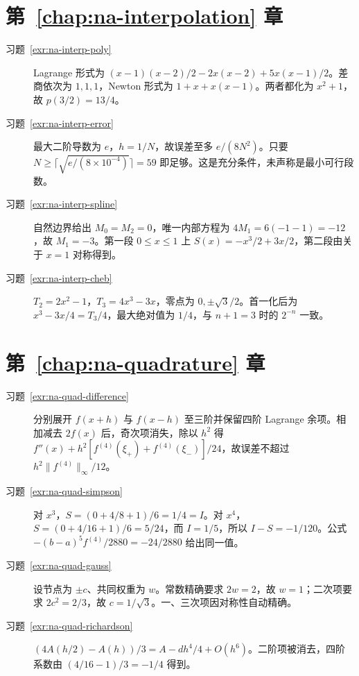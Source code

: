 \documentclass[UTF8,12pt,a4paper,fontset=fandol]{ctexbook}
\begin{document}
\section{第~\ref{chap:na-interpolation} 章}
\begin{description}
\item[习题~\ref{exr:na-interp-poly}] Lagrange 形式为 $(x-1)(x-2)/2-2x(x-2)+5x(x-1)/2$。差商依次为 $1,1,1$，Newton 形式为 $1+x+x(x-1)$。两者都化为 $x^2+1$，故 $p(3/2)=13/4$。
\item[习题~\ref{exr:na-interp-error}] 最大二阶导数为 $e$，$h=1/N$，故误差至多 $e/(8N^2)$。只要 $N\ge\lceil\sqrt{e/(8\times10^{-4})}\rceil=59$ 即足够。这是充分条件，未声称是最小可行段数。
\item[习题~\ref{exr:na-interp-spline}] 自然边界给出 $M_0=M_2=0$，唯一内部方程为 $4M_1=6(-1-1)=-12$，故 $M_1=-3$。第一段 $0\le x\le1$ 上 $S(x)=-x^3/2+3x/2$，第二段由关于 $x=1$ 对称得到。
\item[习题~\ref{exr:na-interp-cheb}] $T_2=2x^2-1$，$T_3=4x^3-3x$，零点为 $0,\pm\sqrt3/2$。首一化后为 $x^3-3x/4=T_3/4$，最大绝对值为 $1/4$，与 $n+1=3$ 时的 $2^{-n}$ 一致。
\end{description}

\section{第~\ref{chap:na-quadrature} 章}
\begin{description}
\item[习题~\ref{exr:na-quad-difference}] 分别展开 $f(x+h)$ 与 $f(x-h)$ 至三阶并保留四阶 Lagrange 余项。相加减去 $2f(x)$ 后，奇次项消失，除以 $h^2$ 得 $f''(x)+h^2[f^{(4)}(\xi_+)+f^{(4)}(\xi_-)]/24$，故误差不超过 $h^2\|f^{(4)}\|_\infty/12$。
\item[习题~\ref{exr:na-quad-simpson}] 对 $x^3$，$S=(0+4/8+1)/6=1/4=I$。对 $x^4$，$S=(0+4/16+1)/6=5/24$，而 $I=1/5$，所以 $I-S=-1/120$。公式 $-(b-a)^5f^{(4)}/2880=-24/2880$ 给出同一值。
\item[习题~\ref{exr:na-quad-gauss}] 设节点为 $\pm c$、共同权重为 $w$。常数精确要求 $2w=2$，故 $w=1$；二次项要求 $2c^2=2/3$，故 $c=1/\sqrt3$。一、三次项因对称性自动精确。
\item[习题~\ref{exr:na-quad-richardson}] $(4A(h/2)-A(h))/3=A-dh^4/4+O(h^6)$。二阶项被消去，四阶系数由 $(4/16-1)/3=-1/4$ 得到。
\end{description}
\end{document}
